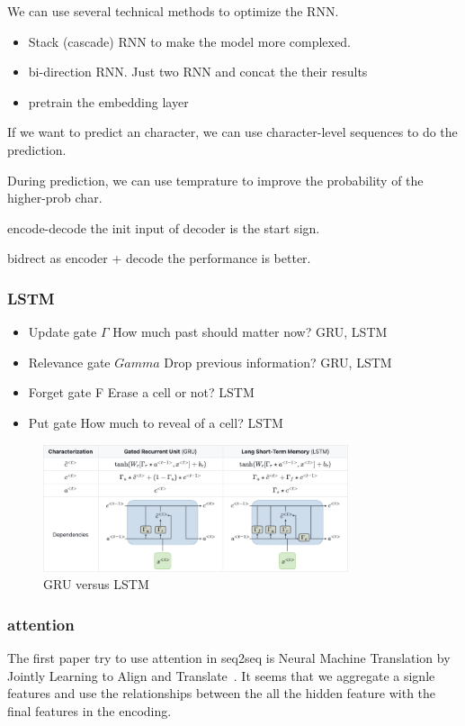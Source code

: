 \documentclass[UTF8]{article}
\begin{document}
We can use several technical methods to optimize the RNN. 
\begin{itemize}
    \item Stack (cascade) RNN to make the model more complexed.
    \item bi-direction RNN. Just two RNN and concat the their results
    \item pretrain the embedding layer
\end{itemize}

If we want to predict an character, we can use character-level sequences to do the prediction.

During prediction, we can use temprature to improve the probability of the higher-prob char.

encode-decode the init input of decoder is the start sign.

bidrect as encoder + decode the performance is better.
\subsubsection{LSTM}
\begin{itemize}
    \item Update gate $\Gamma$ How much past should matter now?	GRU, LSTM
    \item Relevance gate $Gamma$ Drop previous information?	GRU, LSTM
    \item Forget gate F Erase a cell or not?	LSTM
    \item Put gate How much to reveal of a cell?	LSTM
\end{itemize}
\begin{figure}[htbp]
\caption{GRU versus LSTM}
\centering
\includegraphics[width=0.8\textwidth]{stanford.edu__shervine_teaching_cs-230_cheatsheet-recurrent-neural-networks-2.png}
\end{figure}
\subsubsection{attention}
The first paper try to use attention in seq2seq is Neural Machine Translation by Jointly Learning to Align and Translate~\cite{bahdanau2014neural}. It seems that we aggregate a signle features and use the relationships between the all the hidden feature with the final features in the encoding.
\end{document}
